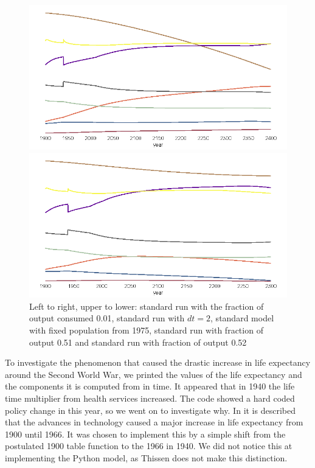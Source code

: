 \documentclass[10pt,a4paper]{scrartcl}
\begin{document}
\begin{figure}
\begin{minipage}{0.49\textwidth}
\end{minipage}\\
\begin{minipage}{0.49\textwidth}
\includegraphics[width=\textwidth]{./plaatjes/output-consumed-0,51.png}
\end{minipage}
\begin{minipage}{0.49\textwidth}
\includegraphics[width=\textwidth]{./plaatjes/output-consumed-0,52.png}
\end{minipage}
\caption{Left to right, upper to lower: standard run with the fraction of output consumed 0.01, standard run with $dt=2$, standard model with fixed population from 1975, standard run with fraction of output 0.51 and standard run with fraction of output 0.52}
\label{composition}
\end{figure}

To investigate the phenomenon that caused the drastic increase in life expectancy around the Second World War, we printed the values of the life expectancy and the components it is computed from in time. It appeared that in 1940 the life time multiplier from health services increased. The code showed a hard coded policy change in this year, so we went on to investigate why. In \cite{meadows1974dynamics} it is described that the advances in technology caused a major increase in life expectancy from 1900 until 1966. It was chosen to implement this by a simple shift from the postulated 1900 table function to the 1966 in 1940. We did not notice this at implementing the Python model, as Thissen does not make this distinction. 
\end{document}
